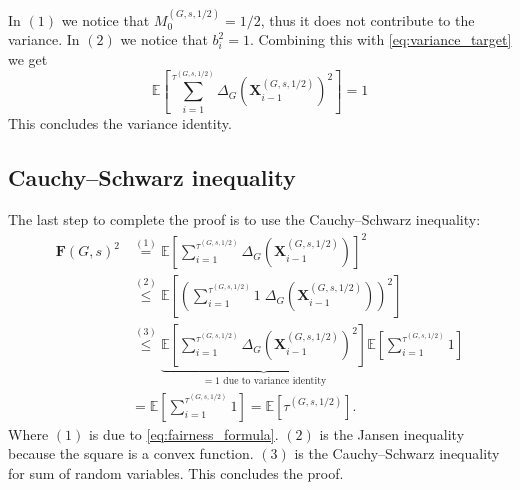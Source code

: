 \documentclass{article}
\newcommand{\x}{\mathbf{X}}
\newcommand{\xghalf}{\x^{\left(G, s, 1/2\right)}}
\newcommand{\taughalf}{{\tau^{\left(G, s, 1/2\right)}}}
\newcommand{\mghalf}{\m^{\left(G, s, 1/2\right)}}
\newcommand{\m}{M}
\newcommand{\ex}{\mathbb{E}}
\newcommand{\fair}{\mathbf{F}}
\begin{document}
In $(1)$ we notice that $\mghalf_0 = 1/2$, thus it does not contribute to the variance. In $(2)$ we notice that $b_i ^2 = 1$. Combining this with \eqref{eq:variance_target} we get
\begin{equation}\label{eq:energy_identity}
    \ex\left[\sum_{i=1}^{\taughalf}\Delta_G\left(\xghalf_{i-1}\right)^2 \right] = 1
\end{equation}
This concludes the variance identity. 

\subsection*{Cauchy--Schwarz inequality}
The last step to complete the proof is to use the Cauchy--Schwarz inequality:
\begin{align*}
    \fair(G, s)^2 &\overset{(1)}{=} \ex\left[\sum_{i=1}^{\taughalf} \Delta_G\left(\xghalf_{i-1}\right)\right]^2 \\
    &\overset{(2)}{\leq} \ex\left[\left(\sum_{i=1}^{\taughalf} 1 \;\Delta_G\left(\xghalf_{i-1}\right)\right)^2\right] \\
    &\overset{(3)}{\leq}\underbrace{\ex\left[\sum_{i=1}^{\taughalf} \Delta_G\left(\xghalf_{i-1}\right)^2\right]}_{= 1 \text{ due to variance identity}} \ex\left[\sum_{i=1}^{\taughalf} 1\right]\\
    &= \ex\left[\sum_{i=1}^{\taughalf} 1\right] = \ex\left[\taughalf\right].
\end{align*}
Where $(1)$ is due to \eqref{eq:fairness_formula}. $(2)$ is the Jansen inequality because the square is a convex function. $(3)$ is the Cauchy--Schwarz inequality for sum of random variables. This concludes the proof.
\end{document}
